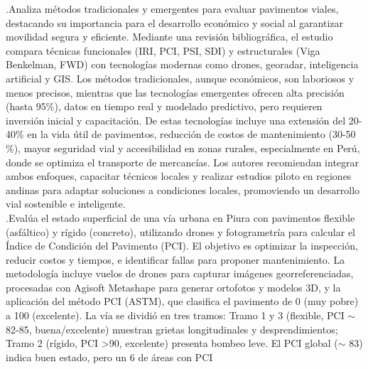 \noindent \textcite{llamkasun2021} .Analiza métodos tradicionales y emergentes para evaluar pavimentos viales, destacando su importancia para el desarrollo económico y social al garantizar movilidad segura y eficiente. Mediante una revisión bibliográfica, el estudio compara técnicas funcionales (IRI, PCI, PSI, SDI) y estructurales (Viga Benkelman, FWD) con tecnologías modernas como drones, georadar, inteligencia artificial y GIS. Los métodos tradicionales, aunque económicos, son laboriosos y menos precisos, mientras que las tecnologías emergentes ofrecen alta precisión (hasta 95$\%$), datos en tiempo real y modelado predictivo, pero requieren inversión inicial y capacitación. 
De estas tecnologías incluye una extensión del 20-40$\%$ en la vida útil de pavimentos, reducción de costos de mantenimiento (30-50$\%$), mayor seguridad vial y accesibilidad en zonas rurales, especialmente en Perú, donde se optimiza el transporte de mercancías. Los autores recomiendan integrar ambos enfoques, capacitar técnicos locales y realizar estudios piloto en regiones andinas para adaptar soluciones a condiciones locales, promoviendo un desarrollo vial sostenible e inteligente.\\

\noindent \textcite{jorge2022} .Evalúa el estado superficial de una vía urbana en Piura con pavimentos flexible (asfáltico) y rígido (concreto), utilizando drones y fotogrametría para calcular el Índice de Condición del Pavimento (PCI). El objetivo es optimizar la inspección, reducir costos y tiempos, e identificar fallas para proponer mantenimiento. La metodología incluye vuelos de drones para capturar imágenes georreferenciadas, procesadas con Agisoft Metashape para generar ortofotos y modelos 3D, y la aplicación del método PCI (ASTM), que clasifica el pavimento de 0 (muy pobre) a 100 (excelente). La vía se dividió en tres tramos: Tramo 1 y 3 (flexible, PCI $\sim$ 82-85, buena/excelente) muestran grietas longitudinales y desprendimientos; Tramo 2 (rígido, PCI >90, excelente) presenta bombeo leve. El PCI global ($\sim$ 83) indica buen estado, pero un 6 de áreas con PCI \\

